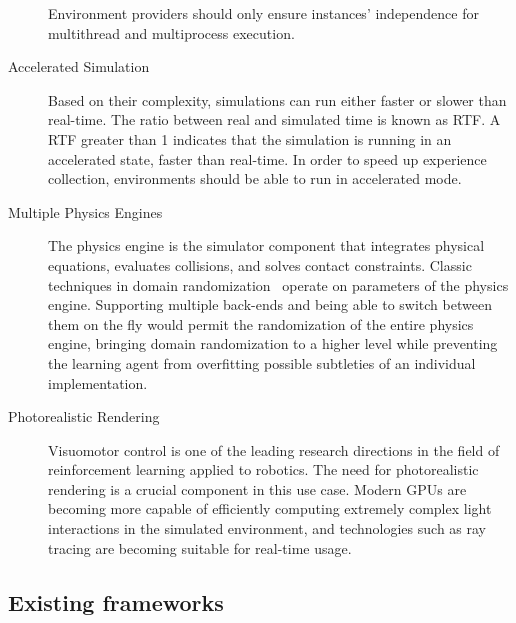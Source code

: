 \begin{addmargin}{-2mm}
\begin{description}
Environment providers should only ensure instances' independence for multithread and multiprocess execution.
%
\item[Accelerated Simulation]
%
Based on their complexity, simulations can run either faster or slower than real-time.
The ratio between real and simulated time is known as \ac{RTF}.
A \ac{RTF} greater than 1 indicates that the simulation is running in an accelerated state, \ie faster than real-time.
In order to speed up experience collection, environments should be able to run in accelerated mode.
%
\item[Multiple Physics Engines]
%
The physics engine is the simulator component that integrates physical equations, evaluates collisions, and solves contact constraints.
Classic techniques in domain randomization~\parencite{peng_sim--real_2018, ramos_bayessim_2019} operate on parameters of the physics engine.
Supporting multiple back-ends and being able to switch between them on the fly would permit the randomization of the entire physics engine, bringing domain randomization to a higher level while preventing
the learning agent from overfitting possible subtleties of an individual implementation.
%
\item[Photorealistic Rendering]
%
Visuomotor control is one of the leading research directions in the field of reinforcement learning applied to robotics.
The need for photorealistic rendering is a crucial component in this use case.
Modern \acp{GPU} are becoming more capable of efficiently computing extremely complex light interactions in the simulated environment, and technologies such as ray tracing are becoming suitable for real-time usage.
%
\end{description}
\end{addmargin}

\subsection{Existing frameworks}

